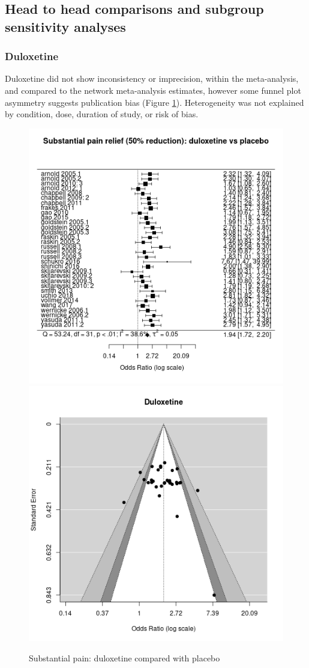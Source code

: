 \documentclass{report}\usepackage[]{graphicx}\usepackage[]{color}
\newenvironment{knitrout}{}{} %
\begin{document}
\subsection{Head to head comparisons and subgroup sensitivity analyses}


\subsubsection{Duloxetine}


Duloxetine did not show inconsistency or imprecision, within the meta-analysis, and compared to the network meta-analysis estimates, however some funnel plot asymmetry suggests publication bias (Figure \ref{fig:painsub-dulox-plac}). Heterogeneity was not explained by condition, dose, duration of study, or risk of bias.

\begin{figure}

\begin{knitrout}
\color{fgcolor}
\includegraphics[width=0.5\linewidth,height=0.35\textheight]{img/pain_sub-duloxetine-placebo-forest} 
\includegraphics[width=0.5\linewidth,height=0.35\textheight]{img/pain_sub-duloxetine-placebo-funnel} 
\end{knitrout}

\caption{Substantial pain: duloxetine compared with placebo
%
}
\label{fig:painsub-dulox-plac}
\end{figure}
\end{document}
